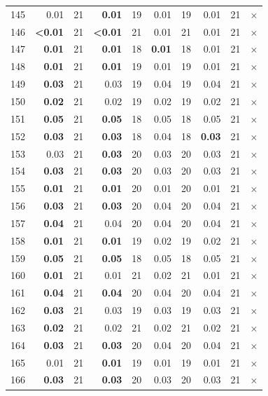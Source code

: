 \begin{longtable}{lr@{\hskip 4pt}l@{\hskip 12pt}r@{\hskip 4pt}l@{\hskip 12pt}r@{\hskip 4pt}l@{\hskip 12pt}r@{\hskip 4pt}l@{\hskip 12pt}r}
145 & 0.01 & 21 & \textbf{0.01} & 19 & 0.01 & 19 & 0.01 & 21 & $\times$ \\
146 & \textbf{<0.01} & 21 & \textbf{<0.01} & 21 & 0.01 & 21 & 0.01 & 21 & $\times$ \\
147 & \textbf{0.01} & 21 & \textbf{0.01} & 18 & \textbf{0.01} & 18 & 0.01 & 21 & $\times$ \\
148 & \textbf{0.01} & 21 & \textbf{0.01} & 19 & 0.01 & 19 & 0.01 & 21 & $\times$ \\
149 & \textbf{0.03} & 21 & 0.03 & 19 & 0.04 & 19 & 0.04 & 21 & $\times$ \\
150 & \textbf{0.02} & 21 & 0.02 & 19 & 0.02 & 19 & 0.02 & 21 & $\times$ \\
151 & \textbf{0.05} & 21 & \textbf{0.05} & 18 & 0.05 & 18 & 0.05 & 21 & $\times$ \\
152 & \textbf{0.03} & 21 & \textbf{0.03} & 18 & 0.04 & 18 & \textbf{0.03} & 21 & $\times$ \\
153 & 0.03 & 21 & \textbf{0.03} & 20 & 0.03 & 20 & 0.03 & 21 & $\times$ \\
154 & \textbf{0.03} & 21 & \textbf{0.03} & 20 & 0.03 & 20 & 0.03 & 21 & $\times$ \\
155 & \textbf{0.01} & 21 & \textbf{0.01} & 20 & 0.01 & 20 & 0.01 & 21 & $\times$ \\
156 & \textbf{0.03} & 21 & \textbf{0.03} & 20 & 0.04 & 20 & 0.04 & 21 & $\times$ \\
157 & \textbf{0.04} & 21 & 0.04 & 20 & 0.04 & 20 & 0.04 & 21 & $\times$ \\
158 & \textbf{0.01} & 21 & \textbf{0.01} & 19 & 0.02 & 19 & 0.02 & 21 & $\times$ \\
159 & \textbf{0.05} & 21 & \textbf{0.05} & 18 & 0.05 & 18 & 0.05 & 21 & $\times$ \\
160 & \textbf{0.01} & 21 & 0.01 & 21 & 0.02 & 21 & 0.01 & 21 & $\times$ \\
161 & \textbf{0.04} & 21 & \textbf{0.04} & 20 & 0.04 & 20 & 0.04 & 21 & $\times$ \\
162 & \textbf{0.03} & 21 & 0.03 & 19 & 0.03 & 19 & 0.03 & 21 & $\times$ \\
163 & \textbf{0.02} & 21 & 0.02 & 21 & 0.02 & 21 & 0.02 & 21 & $\times$ \\
164 & \textbf{0.03} & 21 & \textbf{0.03} & 20 & 0.04 & 20 & 0.04 & 21 & $\times$ \\
165 & 0.01 & 21 & \textbf{0.01} & 19 & 0.01 & 19 & 0.01 & 21 & $\times$ \\
166 & \textbf{0.03} & 21 & \textbf{0.03} & 20 & 0.03 & 20 & 0.03 & 21 & $\times$ \\

\end{longtable}
